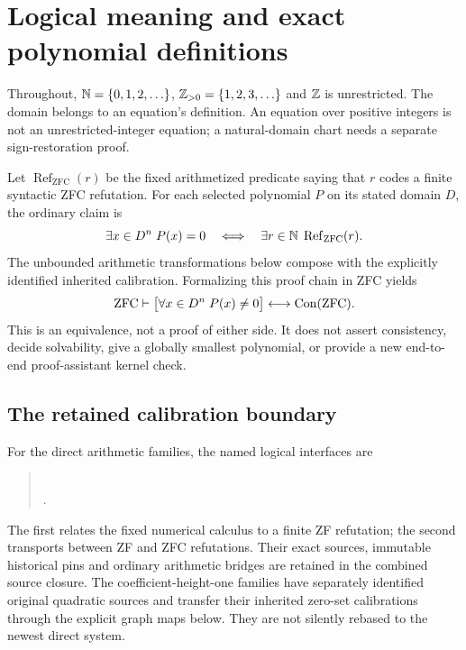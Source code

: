 \section{Logical meaning and exact polynomial definitions}
\label{sec:foundation}
Throughout, $\mathbb N=\{0,1,2,\ldots\}$, $\mathbb Z_{>0}=\{1,2,3,\ldots\}$ and
$\mathbb Z$ is unrestricted. The domain belongs to an equation's definition.
An equation over positive integers is not an unrestricted-integer equation;
a natural-domain chart needs a separate sign-restoration proof.

Let $\operatorname{Ref}_{\mathrm{ZFC}}(r)$ be the fixed arithmetized
predicate saying that $r$ codes a finite syntactic ZFC refutation. For
each selected polynomial $P$ on its stated domain $D$, the ordinary claim is
\begin{equation}\label{eq:calibration}
 \exists x\in D^n\;P(x)=0
 \quad\Longleftrightarrow\quad
 \exists r\in\mathbb N\;\operatorname{Ref}_{\mathrm{ZFC}}(r).
\end{equation}
The unbounded arithmetic transformations below compose with the explicitly
identified inherited calibration. Formalizing this proof chain in ZFC yields
\begin{equation}\label{eq:consistency}
 \mathrm{ZFC}\vdash
 \bigl[\forall x\in D^n\;P(x)\ne0\bigr]
 \longleftrightarrow\operatorname{Con}(\mathrm{ZFC}).
\end{equation}
This is an equivalence, not a proof of either side. It does not assert
consistency, decide solvability, give a globally smallest polynomial, or
provide a new end-to-end proof-assistant kernel check.

\subsection{The retained calibration boundary}
For the direct arithmetic families, the named logical interfaces are
\begin{quote}\small
{}\\
.
\end{quote}
The first relates the fixed numerical calculus to a finite ZF refutation;
the second transports between ZF and ZFC refutations. Their exact sources,
immutable historical pins and ordinary arithmetic bridges are retained in
the combined source closure. The coefficient-height-one families have
separately identified original quadratic sources and transfer their inherited
zero-set calibrations through the explicit graph maps below. They are not
silently rebased to the newest direct system.

